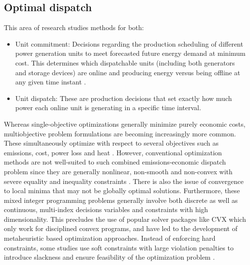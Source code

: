 \documentclass[final,3p,times]{elsarticle}
\begin{document}
\subsection{Optimal dispatch}

This area of research studies methods for both:
\begin{itemize}

    \item Unit commitment: Decisions regarding the production scheduling of different power generation units to meet forecasted future energy demand at minimum cost. This determines which dispatchable units (including both generators and storage devices) are online and producing energy versus being offline at any given time instant \cite{saravanan2013}.
    
    \item Unit dispatch: These are production decisions that set exactly how much power each online unit is generating in a specific time interval.
    
\end{itemize}

Whereas single-objective optimizations generally minimize purely economic costs, multiobjective problem formulations are becoming increasingly more common. These simultaneously optimize with respect to several objectives such as emissions, cost, power loss and heat \cite{pathak2017}. However, conventional optimization methods are not well-suited to such combined emissions-economic dispatch problem since they are generally nonlinear, non-smooth and non-convex with severe equality and inequality constraints \cite{pathak2017}. There is also the issue of convergence to local minima that may not be globally optimal solutions. Furthermore, these mixed integer programming problems generally involve both discrete as well as continuous, multi-index decisions variables and constraints with high dimensionality. This precludes the use of popular solver packages like CVX which only work for disciplined convex programs, and have led to the development of metaheuristic based optimization approaches. Instead of enforcing hard constraints, some studies use soft constraints with large violation penalties to introduce slackness and ensure feasibility of the optimization problem \cite{zachar2016}. 
\end{document}
